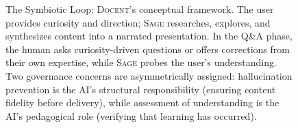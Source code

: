 \documentclass[11pt,a4paper]{article}
\newcommand{\system}{\textsc{Docent}\xspace}
\newcommand{\sage}{\textsc{Sage}\xspace}
\begin{document}
\begin{figure}[t]
\caption{The Symbiotic Loop: \system's conceptual framework. The user provides curiosity and direction; \sage researches, explores, and synthesizes content into a narrated presentation. In the Q\&A phase, the human asks curiosity-driven questions or offers corrections from their own expertise, while \sage probes the user's understanding. Two governance concerns are asymmetrically assigned: hallucination prevention is the AI's structural responsibility (ensuring content fidelity before delivery), while assessment of understanding is the AI's pedagogical role (verifying that learning has occurred).}
\label{fig:symbiotic-loop}
\end{figure}
\end{document}
